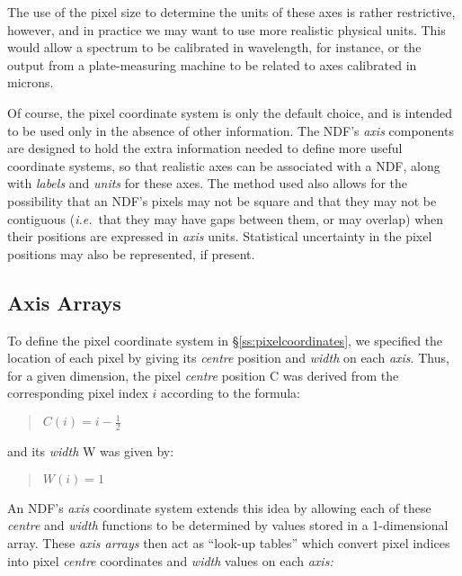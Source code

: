 \documentclass[twoside,11pt,nolof]{starlink}
\providecommand{\st}[1]{{\emph{#1}}}
\begin{document}
The use of the pixel size to determine the units of these axes is rather
restrictive, however, and in practice we may want to use more realistic
physical units.
This would allow a spectrum to be calibrated in wavelength, for instance, or
the output from a plate-measuring machine to be related to axes calibrated
in microns.

Of course, the pixel coordinate system is only the default choice, and is
intended to be used only in the absence of other information.
The NDF's \st{axis\/} components are designed to hold the extra information
needed to define more useful coordinate systems, so that realistic axes can
be associated with a NDF, along with \st{labels\/} and \st{units\/} for
these axes.
The method used also allows for the possibility that an NDF's pixels may not
be square and that they may not be contiguous (\st{i.e.}\ that they may
have gaps between them, or may overlap) when their positions are expressed
in \st{axis\/} units.
Statistical uncertainty in the pixel positions may also be represented, if
present.

\subsection{\label{ss:axisarrays}Axis Arrays}

To define the pixel coordinate system in \S\ref{ss:pixelcoordinates}, we
specified the location of each pixel by giving its \st{centre\/} position
and \st{width\/} on each \st{axis}.
Thus, for a given dimension, the pixel \st{centre\/} position C was derived
from the corresponding pixel index $i$ according to the formula:

\small
\begin{quote}
\begin{center}
$C(i)=i-\frac{1}{2}$
\end{center}
\end{quote}
\normalsize

and its \st{width\/} W was given by:

\small
\begin{quote}
\begin{center}
$W(i)=1$
\end{center}
\end{quote}
\normalsize

An NDF's \st{axis\/} coordinate system extends this idea by allowing each
of these \st{centre\/} and \st{width\/} functions to be determined by
values stored in a 1-dimensional array.
These \st{axis arrays\/} then act as ``look-up tables'' which convert pixel
indices into pixel \st{centre\/} coordinates and \st{width\/} values on
each \st{axis:}
\end{document}
